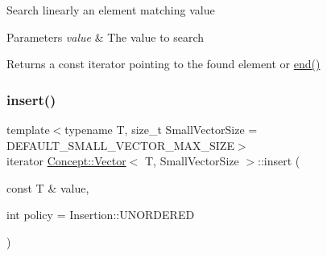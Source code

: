 Search linearly an element matching value 
\begin{DoxyParams}{Parameters}
{\em value} & The value to search \\
\hline
\end{DoxyParams}
\begin{DoxyReturn}{Returns}
a const iterator pointing to the found element or \mbox{\hyperlink{class_concept_1_1_vector_acf6f0b48aa0ecbd09e327d6b173d9ed8}{end()}} 
\end{DoxyReturn}
\mbox{\label{class_concept_1_1_vector_abda5f983b8e539a72ea93e1a051d2b9c}} 
\subsubsection{\texorpdfstring{insert()}{insert()}}
{\footnotesize\ttfamily template$<$typename T, size\+\_\+t Small\+Vector\+Size = D\+E\+F\+A\+U\+L\+T\+\_\+\+S\+M\+A\+L\+L\+\_\+\+V\+E\+C\+T\+O\+R\+\_\+\+M\+A\+X\+\_\+\+S\+I\+ZE$>$ \\
iterator \mbox{\hyperlink{class_concept_1_1_vector}{Concept\+::\+Vector}}$<$ T, Small\+Vector\+Size $>$\+::insert (\begin{DoxyParamCaption}\item[{const T \&}]{value,  }\item[{int}]{policy = {\ttfamily Insertion\+:\+:UNORDERED} }\end{DoxyParamCaption})\hspace{0.3cm}{\ttfamily [inline]}}

